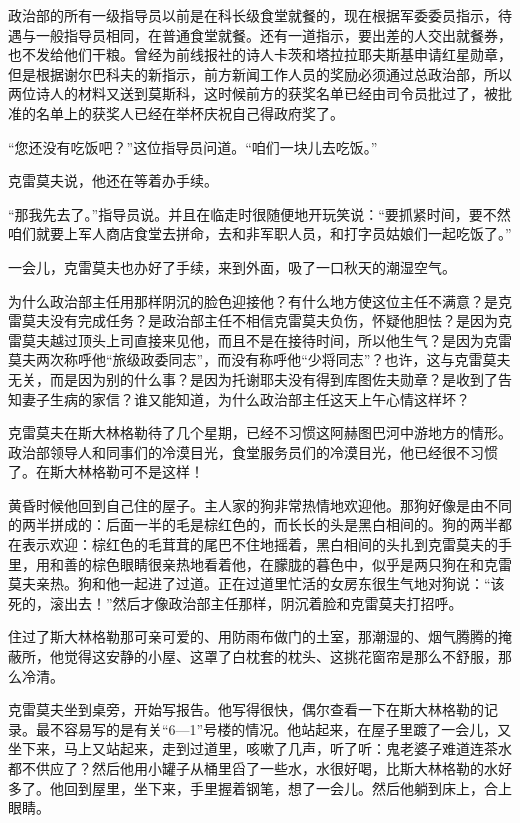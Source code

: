 政治部的所有一级指导员以前是在科长级食堂就餐的，现在根据军委委员指示，待遇与一般指导员相同，在普通食堂就餐。还有一道指示，要出差的人交出就餐券，也不发给他们干粮。曾经为前线报社的诗人卡茨和塔拉拉耶夫斯基申请红星勋章，但是根据谢尔巴科夫的新指示，前方新闻工作人员的奖励必须通过总政治部，所以两位诗人的材料又送到莫斯科，这时候前方的获奖名单已经由司令员批过了，被批准的名单上的获奖人已经在举杯庆祝自己得政府奖了。

“您还没有吃饭吧？”这位指导员问道。“咱们一块儿去吃饭。”

克雷莫夫说，他还在等着办手续。

“那我先去了。”指导员说。并且在临走时很随便地开玩笑说：“要抓紧时间，要不然咱们就要上军人商店食堂去拼命，去和非军职人员，和打字员姑娘们一起吃饭了。”

一会儿，克雷莫夫也办好了手续，来到外面，吸了一口秋天的潮湿空气。

为什么政治部主任用那样阴沉的脸色迎接他？有什么地方使这位主任不满意？是克雷莫夫没有完成任务？是政治部主任不相信克雷莫夫负伤，怀疑他胆怯？是因为克雷莫夫越过顶头上司直接来见他，而且不是在接待时间，所以他生气？是因为克雷莫夫两次称呼他“旅级政委同志”，而没有称呼他“少将同志”？也许，这与克雷莫夫无关，而是因为别的什么事？是因为托谢耶夫没有得到库图佐夫勋章？是收到了告知妻子生病的家信？谁又能知道，为什么政治部主任这天上午心情这样坏？

克雷莫夫在斯大林格勒待了几个星期，已经不习惯这阿赫图巴河中游地方的情形。政治部领导人和同事们的冷漠目光，食堂服务员们的冷漠目光，他已经很不习惯了。在斯大林格勒可不是这样！

黄昏时候他回到自己住的屋子。主人家的狗非常热情地欢迎他。那狗好像是由不同的两半拼成的：后面一半的毛是棕红色的，而长长的头是黑白相间的。狗的两半都在表示欢迎：棕红色的毛茸茸的尾巴不住地摇着，黑白相间的头扎到克雷莫夫的手里，用和善的棕色眼睛很亲热地看着他，在朦胧的暮色中，似乎是两只狗在和克雷莫夫亲热。狗和他一起进了过道。正在过道里忙活的女房东很生气地对狗说：“该死的，滚出去！”然后才像政治部主任那样，阴沉着脸和克雷莫夫打招呼。

住过了斯大林格勒那可亲可爱的、用防雨布做门的土室，那潮湿的、烟气腾腾的掩蔽所，他觉得这安静的小屋、这罩了白枕套的枕头、这挑花窗帘是那么不舒服，那么冷清。

克雷莫夫坐到桌旁，开始写报告。他写得很快，偶尔查看一下在斯大林格勒的记录。最不容易写的是有关“6—1”号楼的情况。他站起来，在屋子里踱了一会儿，又坐下来，马上又站起来，走到过道里，咳嗽了几声，听了听：鬼老婆子难道连茶水都不供应了？然后他用小罐子从桶里舀了一些水，水很好喝，比斯大林格勒的水好多了。他回到屋里，坐下来，手里握着钢笔，想了一会儿。然后他躺到床上，合上眼睛。

